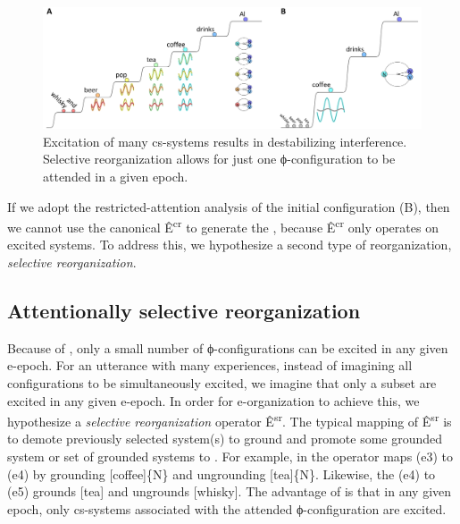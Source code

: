   
\begin{figure}
\includegraphics[width=\textwidth]{figures/Tilsen-img98.png}
\caption{Excitation of many cs-systems results in destabilizing interference. Selective reorganization allows for just one ϕ-configuration to be attended in a given epoch.}
\label{fig:4:48}
\end{figure}
 

  If we adopt the restricted-attention analysis of the initial configuration (B), then we cannot use the canonical  Ê\textsuperscript{cr} to generate the , because Ê\textsuperscript{cr} only operates on excited systems. To address this, we hypothesize a second type of reorganization, \textit{selective reorganization}.

\subsection{Attentionally selective reorganization}

Because of , only a small number of ϕ-configurations can be excited in any given e-epoch. For an utterance with many  experiences, instead of imagining all configurations to be simultaneously excited, we imagine that only a subset are excited in any given e-epoch. In order for e-organization to achieve this, we hypothesize a \textit{selective reorganization} operator Ê\textsuperscript{sr}. The typical mapping of  Ê\textsuperscript{sr} is to demote previously selected system(s) to ground and promote some grounded system or set of grounded systems to . For example, in {} the  operator maps (e3) to (e4) by grounding [coffee]\{N\} and ungrounding [tea]\{N\}. Likewise, the  (e4) to (e5) grounds [tea] and ungrounds [whisky]. The advantage of  is that in any given epoch, only cs-systems associated with the attended ϕ-configuration are excited.

